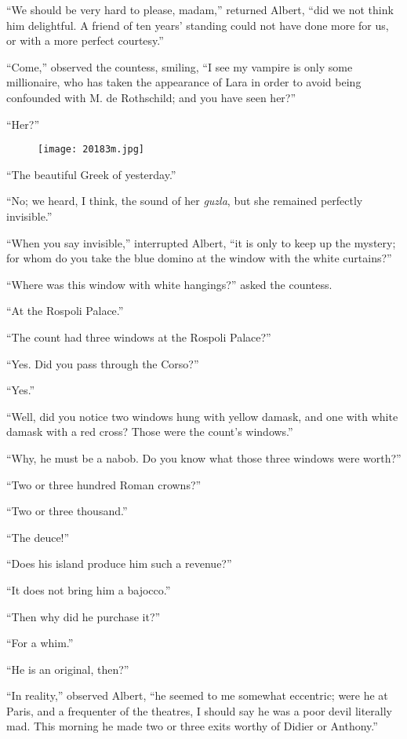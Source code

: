“We should be very hard to please, madam,” returned Albert, “did we not
think him delightful. A friend of ten years’ standing could not have
done more for us, or with a more perfect courtesy.”

“Come,” observed the countess, smiling, “I see my vampire is only some
millionaire, who has taken the appearance of Lara in order to avoid
being confounded with M. de Rothschild; and you have seen her?”

“Her?”

\begin{figure}[ht]
\texttt{[image: 20183m.jpg]}
\end{figure}

“The beautiful Greek of yesterday.”

“No; we heard, I think, the sound of her \textit{guzla}, but she remained
perfectly invisible.”

“When you say invisible,” interrupted Albert, “it is only to keep up
the mystery; for whom do you take the blue domino at the window with
the white curtains?”

“Where was this window with white hangings?” asked the countess.

“At the Rospoli Palace.”

“The count had three windows at the Rospoli Palace?”

“Yes. Did you pass through the Corso?”

“Yes.”

“Well, did you notice two windows hung with yellow damask, and one with
white damask with a red cross? Those were the count’s windows.”

“Why, he must be a nabob. Do you know what those three windows were
worth?”

“Two or three hundred Roman crowns?”

“Two or three thousand.”

“The deuce!”

“Does his island produce him such a revenue?”

“It does not bring him a bajocco.”

“Then why did he purchase it?”

“For a whim.”

“He is an original, then?”

“In reality,” observed Albert, “he seemed to me somewhat eccentric;
were he at Paris, and a frequenter of the theatres, I should say he was
a poor devil literally mad. This morning he made two or three exits
worthy of Didier or Anthony.”

